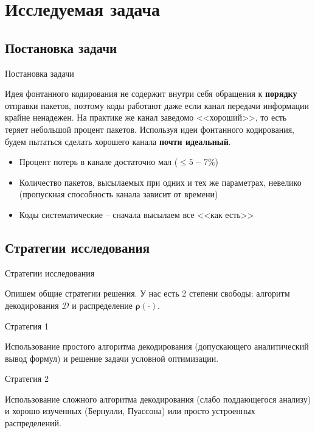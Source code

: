 \documentclass{beamer}
\begin{document}
\section{Исследуемая задача}

\subsection{Постановка задачи}

\begin{frame}{Постановка задачи}

    Идея фонтанного кодирования не содержит внутри себя обращения
    к \textbf{порядку} отправки пакетов, поэтому коды работают даже
    если канал передачи информации крайне ненадежен. На практике же
    канал заведомо <<хороший>>, то есть теряет небольшой процент пакетов.
    Используя идеи фонтанного кодирования, будем пытаться сделать хорошего
    канала \textbf{почти идеальный}. 

    \begin{itemize}
        
        \item Процент потерь в канале достаточно мал ($\le5-7\%$) 

        \item Количество пакетов, высылаемых при одних и тех же параметрах,
        невелико (пропускная способность канала зависит от времени)

        \item Коды систематические -- сначала высылаем все <<как есть>>
        
    \end{itemize}

\end{frame}

\subsection{Стратегии исследования}

\begin{frame}{Стратегии исследования}

    Опишем общие стратегии решения. 
    У нас есть 2 степени свободы: алгоритм декодирования $\mathcal D$ и
    распределение $\boldsymbol{\rho}(\cdot)$. 

    \begin{block}{Стратегия 1}

        Использование простого алгоритма декодирования (допускающего аналитический вывод формул)
        и решение задачи условной оптимизации.
        
    \end{block}

    \begin{block}{Стратегия 2}

        Использование сложного алгоритма декодирования (слабо поддающегося анализу)
        и хорошо изученных (Бернулли, Пуассона) или просто устроенных распределений.
    
    \end{block}

\end{frame}
\end{document}
